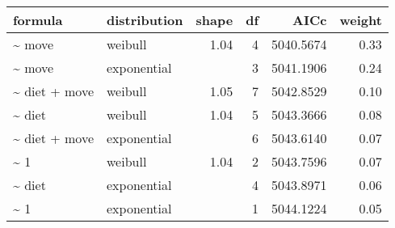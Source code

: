 \begin{table}[ht]
\centering
\begin{tabular}{llrrrr}
 formula & distribution & shape & df & AICc & weight \\ 
  \hline
\~{} move & weibull & 1.04 & 4 & 5040.5674 & 0.33 \\ 
  \~{} move & exponential &  & 3 & 5041.1906 & 0.24 \\ 
  \~{} diet + move & weibull & 1.05 & 7 & 5042.8529 & 0.10 \\ 
  \~{} diet & weibull & 1.04 & 5 & 5043.3666 & 0.08 \\ 
  \~{} diet + move & exponential &  & 6 & 5043.6140 & 0.07 \\ 
  \~{} 1 & weibull & 1.04 & 2 & 5043.7596 & 0.07 \\ 
  \~{} diet & exponential &  & 4 & 5043.8971 & 0.06 \\ 
  \~{} 1 & exponential &  & 1 & 5044.1224 & 0.05 \\ 
  \end{tabular}
\label{tab:nag}
\end{table}
